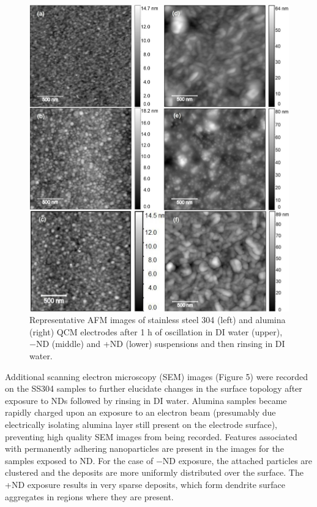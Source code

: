 \begin{figure}[hbtp]
	\centering
	\includegraphics[width=1.0\textwidth]{Chapter-4/fig4_png}
	\caption{Representative AFM images of stainless steel 304 (left) and alumina (right) QCM electrodes after 1 h of oscillation in DI water (upper), −ND (middle) and +ND (lower) suspensions and then rinsing in DI water.}
	\label{fig4:AFM images}
\end{figure} 

Additional scanning electron microscopy (SEM) images (Figure 5) were recorded on the SS304 samples to further elucidate changes in the surface topology after exposure to NDs followed by rinsing in DI water. Alumina samples became rapidly charged upon an exposure to an electron beam (presumably due electrically isolating alumina layer still present on the electrode surface), preventing high quality SEM images from being recorded. Features associated with permanently adhering nanoparticles are present in the images for the samples exposed to ND. For the case of $−$ND exposure, the attached particles are clustered and the deposits are more uniformly distributed over the surface. The +ND exposure results in very sparse deposits, which form dendrite surface aggregates in regions where they are present.

